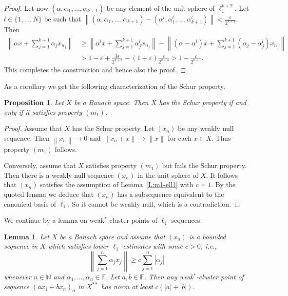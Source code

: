 \documentclass{amsart}
\numberwithin{equation}{section}
\newtheorem{lemma}[thm]{Lemma}
\newtheorem{prop}[thm]{Proposition}
\theoremstyle{definition}
\def\ep{\varepsilon}
\def\en{\mathbb N}
\def\ef{\mathbb F}
\newcommand{\norm}[1]{\left\|#1\right\|}
\newcommand{\abs}[1]{\left|#1\right|}
\begin{document}
\begin{proof}
 Let now $(\alpha,\alpha_1,\dots,\alpha_{k+1})$ be any element of the unit sphere of $\ell_1^{k+2}$. Let $l\in\{1,\dots,N\}$
   be such that $\norm{(\alpha,\alpha_1,\dots,\alpha_{k+1})-(\alpha^l,\alpha_1^l,\dots,\alpha_{k+1}^l)}<\frac{\ep}{2^{k+3}}$. Then
   $$\begin{aligned}
   \norm{\alpha x+\sum_{j=1}^{k+1}\alpha_j x_{n_j}}&\ge \norm{\alpha^l x+\sum_{j=1}^{k+1}\alpha_j^l x_{n_j}}-\norm{(\alpha-\alpha^l) x+\sum_{j=1}^{k+1}(\alpha_j -\alpha_j^l)x_{n_j}} \\&>1-\ep+\tfrac{3\ep}{2^{k+2}}-(1+\ep)\tfrac{\ep}{2^{k+3}}>1-\tfrac{\ep}{2^{k+1}}.\end{aligned}$$
   This completes the construction and hence also the proof.\end{proof}

As a corollary we get the following characterization of the Schur property.

\begin{prop}
    Let $X$ be a Banach space. Then $X$ has the Schur property if and only if it satisfies property $(m_1)$.
\end{prop}

\begin{proof}
    Assume that $X$ has the Schur property. Let $(x_n)$ be any weakly null sequence. Then $\norm{x_n}\to0$ and $\norm{x_n+x}\to\norm{x}$ for each $x\in X$. Thus property $(m_1)$ follows.

    Conversely, assume that $X$ satisfies property $(m_1)$ but fails the Schur property. Then there is a weakly null sequence $(x_n)$ in the unit sphere of $X$. It follows that $(x_n)$ satisfies the assumption of Lemma~\ref{L:m1-ell1} with $c=1$. By the quoted lemma we deduce that $(x_n)$ has a subsequence equivalent to the canonical basis of $\ell_1$. So it cannot be weakly null, which is a contradiction.
\end{proof}

We continue by a lemma on weak$^*$ cluster points of $\ell_1$-sequences.


\begin{lemma}\label{L:hrombod}
    Let $X$ be a Banach space and assume that $(x_n)$ is a bounded sequence in $X$ which satisfies lower $\ell_1$-estimates with some $c>0$, i.e.,
    $$ \norm{\sum_{j=1}^n\alpha_jx_j}\ge c\sum_{j=1}^n\abs{\alpha_j}$$
   whenever $n\in\en$ and $\alpha_1,\dots,\alpha_n\in\ef$. Let $a,b\in\ef$. Then any weak$^*$-cluster point of sequence $(ax_1+bx_n)_n$ in $X^{**}$ has norm at least $c(\abs{a}+\abs{b})$.
\end{lemma}
\end{document}

